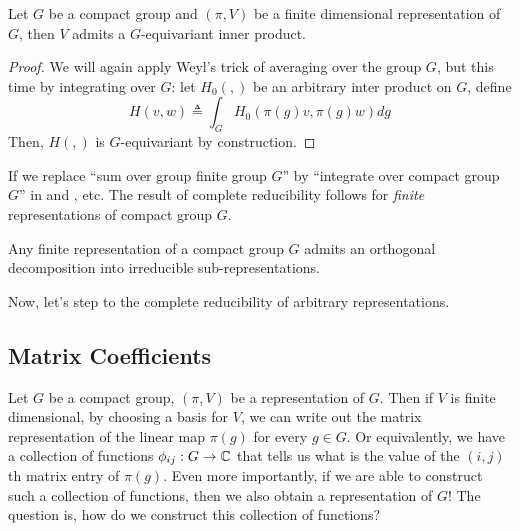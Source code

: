 \begin{thm}
  Let $G$ be a compact group and $(\pi,V)$ be a finite dimensional
  representation of $G$, then $V$ admits a $G$-equivariant inner product.
\end{thm}

\begin{proof}
  We will again apply Weyl's trick of averaging over the group $G$, but this
  time by integrating over $G$: let $H_0(,)$ be an arbitrary inter
  product on $G$, define
  \[
    H(v,w) \triangleq \int_G H_0(\pi(g)v, \pi(g)w) dg
  \]
  Then, $H(,)$ is $G$-equivariant by construction.
\end{proof}

If we replace ``sum over group finite group $G$'' by ``integrate over compact
group $G$'' in  and , etc. The result of
complete reducibility follows for \emph{finite} representations of compact group
$G$.



\begin{thm}
  Any finite representation of a compact group $G$ admits an orthogonal
  decomposition into irreducible sub-representations.
\end{thm}

Now, let's step to the complete reducibility of arbitrary representations.

\subsection{Matrix Coefficients}

Let $G$ be a compact group, $(\pi,V)$ be a representation of $G$.  Then if $V$
is finite dimensional, by choosing a basis for $V$, we can write out the matrix
representation of the linear map $\pi(g)$ for every $g \in G$.  Or equivalently,
we have a collection of functions $\phi_{ij} : G \to \operatorname{\mathbb{C}}$ that tells us what is
the value of the $(i,j)$th matrix entry of $\pi(g)$.  Even more importantly, if
we are able to construct such a collection of functions, then we also obtain a
representation of $G$! The question is, how do we construct this collection of
functions?

